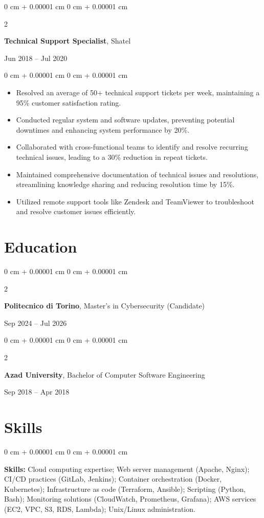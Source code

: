 \documentclass[10pt, letterpaper]{article}
\newenvironment{highlights}{
    \begin{itemize}[
        topsep=0.10 cm,
        parsep=0.10 cm,
        partopsep=0pt,
        itemsep=0pt,
        leftmargin=0 cm + 10pt
    ]
}{
    \end{itemize}
} %
\newenvironment{onecolentry}{
    \begin{adjustwidth}{
        0 cm + 0.00001 cm
    }{
        0 cm + 0.00001 cm
    }
}{
    \end{adjustwidth}
} %
\newenvironment{twocolentry}[2][]{
    \onecolentry
    \def\secondColumn{#2}
    \setcolumnwidth{\fill, 4.5 cm}
    \begin{paracol}{2}
}{
    \switchcolumn \raggedleft \secondColumn
    \end{paracol}
    \endonecolentry
} %
\begin{document}
                \begin{twocolentry}{Jun 2018 -- Jul 2020}
                    \textbf{Technical Support Specialist}, Shatel
                \end{twocolentry}
                \vspace{0.10 cm}
                \begin{onecolentry}
                    \begin{highlights}
                        \item Resolved an average of 50+ technical support tickets per week, maintaining a 95\% customer satisfaction rating.
                        \item Conducted regular system and software updates, preventing potential downtimes and enhancing system performance by 20\%.
                        \item Collaborated with cross-functional teams to identify and resolve recurring technical issues, leading to a 30\% reduction in repeat tickets.
                        \item Maintained comprehensive documentation of technical issues and resolutions, streamlining knowledge sharing and reducing resolution time by 15\%.
                        \item Utilized remote support tools like Zendesk and TeamViewer to troubleshoot and resolve customer issues efficiently.
                    \end{highlights}
                \end{onecolentry}

            \section{Education}
                \begin{twocolentry}{Sep 2024 -- Jul 2026}
                    \textbf{Politecnico di Torino}, Master's in Cybersecurity (Candidate)
                \end{twocolentry}

                \vspace{0.10 cm}
                \begin{twocolentry}{Sep 2018 -- Apr 2018}
                    \textbf{Azad University}, Bachelor of Computer Software Engineering
                \end{twocolentry}

            \section{Skills}
                \begin{onecolentry}
                    \textbf{Skills:} Cloud computing expertise; Web server management (Apache, Nginx); CI/CD practices (GitLab, Jenkins); Container orchestration (Docker, Kubernetes); Infrastructure as code (Terraform, Ansible); Scripting (Python, Bash); Monitoring solutions (CloudWatch, Prometheus, Grafana); AWS services (EC2, VPC, S3, RDS, Lambda); Unix/Linux administration.
                \end{onecolentry}
\end{document}
